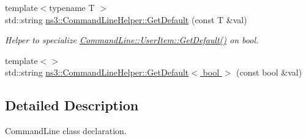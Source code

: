 {\bf }\par
\begin{DoxyCompactItemize}
\item 
{\footnotesize template$<$typename T $>$ }\\std\+::string \hyperlink{group__commandlinehelper_ga9a8370d21f9b801cd8c631f66f0d5c39}{ns3\+::\+Command\+Line\+Helper\+::\+Get\+Default} (const T \&val)
\begin{DoxyCompactList}\small\item\em Helper to specialize \hyperlink{classns3_1_1CommandLine_1_1UserItem_a8beb0fdb64ff17d1e4717e3b4c50c573}{Command\+Line\+::\+User\+Item\+::\+Get\+Default()} on bool. \end{DoxyCompactList}\item 
{\footnotesize template$<$$>$ }\\std\+::string \hyperlink{group__commandlinehelper_gaa9a9ae90ef630d3cbfda231dcc708d3c}{ns3\+::\+Command\+Line\+Helper\+::\+Get\+Default$<$ bool $>$} (const bool \&val)
\end{DoxyCompactItemize}



\subsection{Detailed Description}
Command\+Line class declaration. 